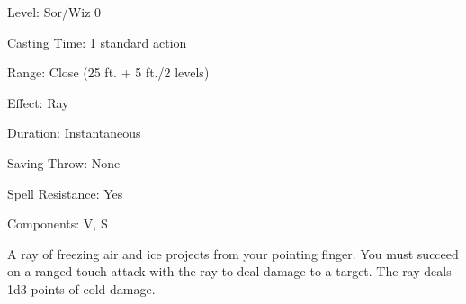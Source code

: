 
\begin{description*}
\item[Level:] Sor/Wiz 0
\item[Casting Time:] 1 standard action
\item[Range:] Close (25 ft. + 5 ft./2 levels)
\item[Effect:] Ray
\item[Duration:] Instantaneous
\item[Saving Throw:] None
\item[Spell Resistance:] Yes
\item[Components:] V, S
\end{description*}

A ray of freezing air and ice projects from your pointing finger. You must succeed
on a ranged touch attack with the ray to deal damage to a target. The ray deals
1d3 points of cold damage.